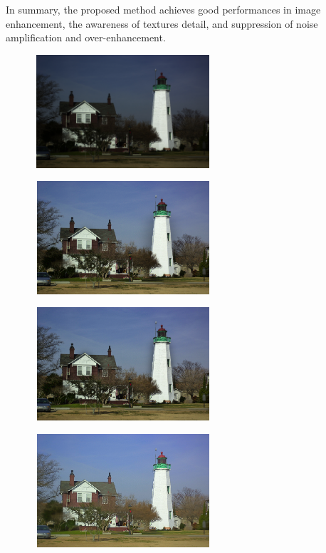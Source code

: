 In summary, the proposed method achieves good performances in image enhancement, the awareness of textures detail, and suppression of noise amplification and over-enhancement.
\begin{figure}[htbp]
\centering
	\begin{minipage}[b]{0.49\hsize}
		\centering
		\includegraphics[width=66mm, height=42mm]{images/experiment/qualitative/comp1/1/input.eps}
		 \label{fig:qualitative/1/input}
	\end{minipage}
	\begin{minipage}[b]{0.49\hsize}
		\centering
		\includegraphics[width=66mm, height=42mm]{images/experiment/qualitative/comp1/1/srie.eps}
		 \label{fig:qualitative/1/srie}
	\end{minipage} 
	\begin{minipage}[b]{0.49\hsize}
		\centering
		\includegraphics[width=66mm, height=42mm]{images/experiment/qualitative/comp1/1/wvm.eps}
		 \label{fig:qualitative/1/wvm}
	\end{minipage}
	\begin{minipage}[b]{0.49\hsize}
		\centering
		\includegraphics[width=66mm, height=42mm]{images/experiment/qualitative/comp1/1/rrm.eps}

\end{minipage}
\end{figure}
